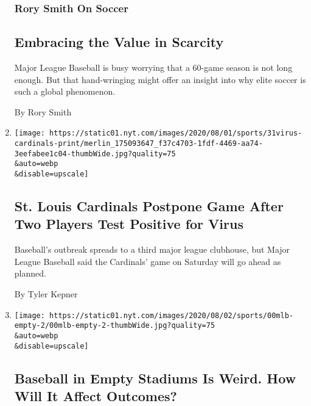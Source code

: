 \begin{enumerate}
{  \subsubsection{Rory Smith On Soccer}\label{rory-smith-on-soccer}}

  \hypertarget{embracing-the-value-in-scarcity}{%
  \subsection{Embracing the Value in
  Scarcity}\label{embracing-the-value-in-scarcity}}

  Major League Baseball is busy worrying that a 60-game season is not
  long enough. But that hand-wringing might offer an insight into why
  elite soccer is such a global phenomenon.

  By Rory Smith
\item
  \href{/2020/07/31/sports/baseball/cardinals-twins-coronavirus-mlb.html}{}

  \texttt{[image: https://static01.nyt.com/images/2020/08/01/sports/31virus-cardinals-print/merlin\_175093647\_f37c4703-1fdf-4469-aa74-3eefabee1c04-thumbWide.jpg?quality=75\\\&auto=webp\\\&disable=upscale]}

  \hypertarget{st-louis-cardinals-postpone-game-after-two-players-test-positive-for-virus}{%
  \subsection{St. Louis Cardinals Postpone Game After Two Players Test
  Positive for
  Virus}\label{st-louis-cardinals-postpone-game-after-two-players-test-positive-for-virus}}

  Baseball's outbreak spreads to a third major league clubhouse, but
  Major League Baseball said the Cardinals' game on Saturday will go
  ahead as planned.

  By Tyler Kepner
\item
  \href{/2020/07/31/sports/baseball/baseball-empty-stadiums-effects.html}{}

  \texttt{[image: https://static01.nyt.com/images/2020/08/02/sports/00mlb-empty-2/00mlb-empty-2-thumbWide.jpg?quality=75\\\&auto=webp\\\&disable=upscale]}

  \hypertarget{baseball-in-empty-stadiums-is-weird-how-will-it-affect-outcomes}{%
  \subsection{Baseball in Empty Stadiums Is Weird. How Will It Affect
  Outcomes?}\label{baseball-in-empty-stadiums-is-weird-how-will-it-affect-outcomes}}


\end{enumerate}
